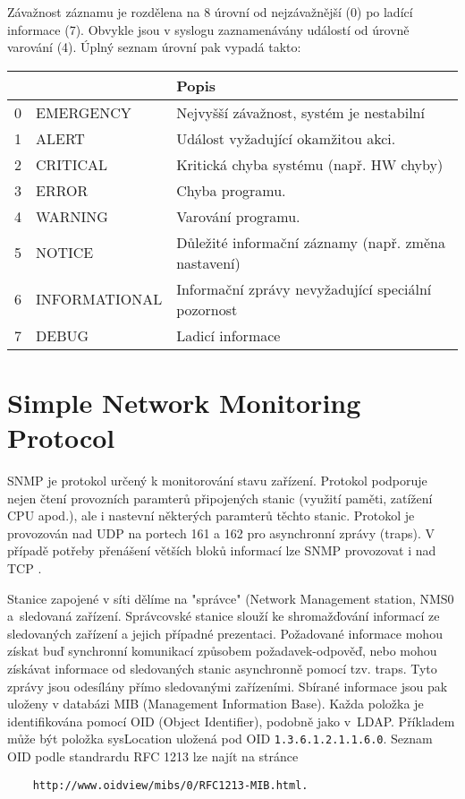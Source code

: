 Závažnost záznamu je rozdělena na 8 úrovní od nejzávažnější (0) po ladící informace (7). Obvykle
 jsou v syslogu zaznamenávány událostí od úrovně varování (4). Úplný seznam úrovní pak vypadá takto:
\begin{table}[!h]
	\centering
	\begin{tabular}[!h]{|c|l|l|}
	\hline
	\shortstack{Závažnost} & & Popis \\
	\hline
	0 & EMERGENCY & Nejvyšší závažnost, systém je nestabilní\\
	1 & ALERT & Událost vyžadující okamžitou akci.\\
	2 & CRITICAL & Kritická chyba systému (např. HW chyby) \\
	3 & ERROR & Chyba programu.\\
	4 & WARNING & Varování programu.\\
	5 & NOTICE & Důležité informační záznamy (např. změna nastavení)\\
	6 & INFORMATIONAL & Informační zprávy nevyžadující speciální pozornost\\
	7 & DEBUG & Ladicí informace\\
	\hline
	\end{tabular}
\end{table}


\section{Simple Network Monitoring Protocol}
SNMP \cite{rfc1157} je protokol určený k monitorování stavu zařízení. Protokol podporuje nejen čtení
 provozních paramterů připojených stanic (využití paměti, zatížení CPU apod.), ale i nastevní
 některých paramterů těchto stanic.
Protokol je provozován nad UDP na portech 161 a 162 pro asynchronní zprávy (traps). V případě
 potřeby přenášení větších bloků informací lze SNMP provozovat i nad TCP \cite{rfc3430}.

Stanice zapojené v síti dělíme na "správce" (Network Management station, NMS0 a~sledovaná zařízení.
 Správcovské stanice slouží ke shromažďování informací ze sledovaných zařízení a jejich případné prezentaci.
Požadované informace mohou získat buď synchronní komunikací způsobem požadavek-odpověď, nebo mohou
 získávat informace od sledovaných stanic asynchronně pomocí tzv. traps. Tyto zprávy jsou odesílány
 přímo sledovanými zařízeními. Sbírané informace jsou pak uloženy v databázi MIB
 (Management Information Base). Každa položka je identifikována pomocí OID (Object Identifier),
 podobně jako v~LDAP. Příkladem může být položka sysLocation uložená pod OID {\tt 1.3.6.1.2.1.1.6.0}.
 Seznam OID podle standrardu RFC 1213 \cite{rfc1213} lze najít na stránce
\begin{verbatim}
    http://www.oidview/mibs/0/RFC1213-MIB.html.
\end{verbatim}

